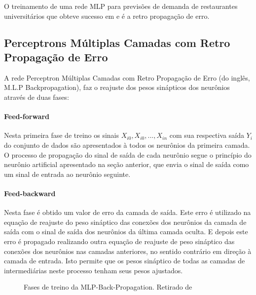 \documentclass[	12pt, Times, openright, twoside, a4paper, english, brazil]{abntex2}
\begin{document}
        O treinamento de uma rede MLP para previsões de demanda de restaurantes universitários que obteve sucesso em \cite{Lopes2008} e \cite{Rocha2011} é a retro propagação de erro.
        \subsection{Perceptrons Múltiplas Camadas com Retro Propagação de Erro}
        A rede Perceptron Múltiplas Camadas com Retro Propagação de Erro (do inglês, M.L.P Backpropagation), faz o reajuste dos pesos sinápticos dos neurônios através de duas fases:
  	       \paragraph{Feed-forward} Nesta primeira fase de treino os sinais $X_{i0},X_{i0},...,X_{in}$ com sua respectiva saída $Y_i$ do conjunto de dados são apresentados à todos os neurônios da primeira camada. O processo de propagação do sinal de saída de cada neurônio segue o princípio do neurônio artificial apresentado na seção anterior, que envia o sinal de saída como um sinal de entrada ao neurônio seguinte.
  	       
  	       \paragraph{Feed-backward} Nesta fase é obtido um valor de erro da camada de saída. Este erro é utilizado na equação de reajuste do peso sináptico das conexões dos neurônios da camada de saída com o sinal de saída dos neurônios da última camada oculta. E depois este erro é propagado realizando outra equação de reajuste de peso sináptico das conexões dos neurônios nas camadas anteriores, no sentido contrário em direção à camada de entrada. Isto permite que os pesos sináptico de todas as camadas de intermediárias neste processo tenham seus pesos ajustados.
  	       
  	       \begin{figure}[!ht]
  	       	\caption{Fases de treino da MLP-Back-Propagation. Retirado de \cite{Almeida2013}\label{fig:MLP2}}
  	       \end{figure}
  	       
\end{document}
